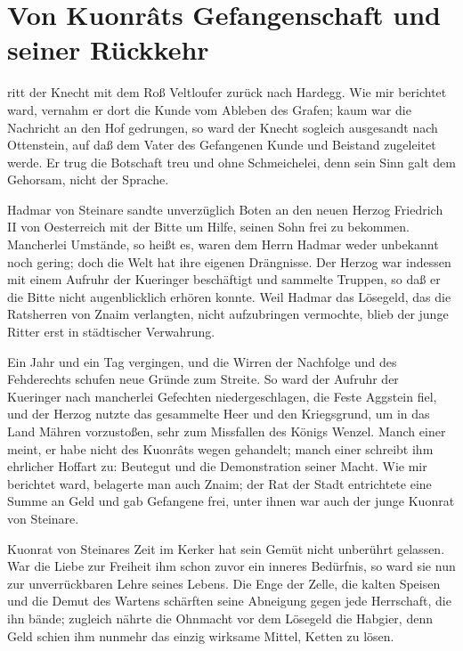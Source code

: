 \section{Von Kuonr\^{a}ts Gefangenschaft und seiner Rückkehr}

 ritt der \gls{Knecht} mit dem Roß \gls{Veltloufer} zurück nach \gls{Hardegg}. Wie mir berichtet ward, vernahm er dort die Kunde vom Ableben des Grafen; kaum war die Nachricht an den Hof gedrungen, so ward der \gls{Knecht} sogleich ausgesandt nach Ottenstein, auf daß dem Vater des Gefangenen Kunde und Beistand zugeleitet werde. Er trug die Botschaft treu und ohne Schmeichelei, denn sein Sinn galt dem Gehorsam, nicht der Sprache.

\gls{Hadmar von Steinare} sandte unverzüglich Boten an den neuen Herzog \gls{Friedrich II von Oesterreich} mit der Bitte um Hilfe, seinen Sohn frei zu bekommen. Mancherlei Umstände, so heißt es, waren dem Herrn Hadmar weder unbekannt noch gering; doch die Welt hat ihre eigenen Drängnisse. Der Herzog war indessen mit einem Aufruhr der \gls{Kueringer} beschäftigt und sammelte Truppen, so daß er die Bitte nicht augenblicklich erhören konnte. Weil Hadmar das Lösegeld, das die Ratsherren von Znaim verlangten, nicht aufzubringen vermochte, blieb der junge Ritter erst in städtischer Verwahrung.

Ein Jahr und ein Tag vergingen, und die Wirren der Nachfolge und des Fehderechts schufen neue Gründe zum Streite. So ward der Aufruhr der \gls{Kueringer} nach mancherlei Gefechten niedergeschlagen, die Feste \gls{Aggstein} fiel, und der Herzog nutzte das gesammelte Heer und den Kriegsgrund, um in das Land Mähren vorzustoßen, sehr zum Missfallen des Königs Wenzel. Manch einer meint, er habe nicht des Kuonr\^{a}ts wegen gehandelt; manch einer schreibt ihm ehrlicher Hoffart zu: Beutegut und die Demonstration seiner Macht. Wie mir berichtet ward, belagerte man auch Znaim; der Rat der Stadt entrichtete eine Summe an Geld und gab Gefangene frei, unter ihnen war auch der junge \gls{Kuonrat von Steinare}.

\gls{Kuonrat von Steinare}s Zeit im Kerker hat sein Gemüt nicht unberührt gelassen. War die Liebe zur \gls{Freiheit} ihm schon zuvor ein inneres Bedürfnis, so ward sie nun zur unverrückbaren Lehre seines Lebens. Die Enge der Zelle, die kalten Speisen und die Demut des Wartens schärften seine Abneigung gegen jede Herrschaft, die ihn bände; zugleich nährte die Ohnmacht vor dem Lösegeld die Habgier, denn Geld schien ihm nunmehr das einzig wirksame Mittel, Ketten zu lösen.

